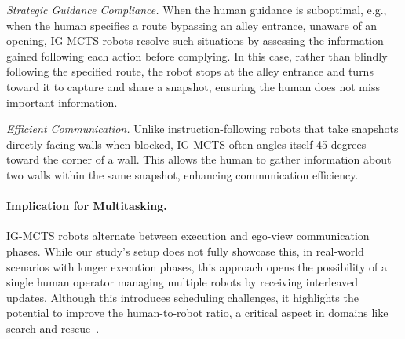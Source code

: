 \emph{Strategic Guidance Compliance.}
When the human guidance is suboptimal, e.g., when the human specifies a route bypassing an alley entrance, unaware of an opening, IG-MCTS robots resolve such situations by assessing the information gained following each action before complying. In this case, rather than blindly following the specified route, the robot stops at the alley entrance and turns toward it to capture and share a snapshot, ensuring the human does not miss important information.

\emph{Efficient Communication.}
Unlike instruction-following robots that take snapshots directly facing walls when blocked, IG-MCTS often angles itself 45 degrees toward the corner of a wall. This allows the human to gather information about two walls within the same snapshot, enhancing communication efficiency.


\paragraph{Implication for Multitasking.}
IG-MCTS robots alternate between execution and ego-view communication phases. While our study’s setup does not fully showcase this, in real-world scenarios with longer execution phases, this approach opens the possibility of a single human operator managing multiple robots by receiving interleaved updates. Although this introduces scheduling challenges, it highlights the potential to improve the human-to-robot ratio, a critical aspect in domains like search and rescue~\cite{murphy2004human}.


